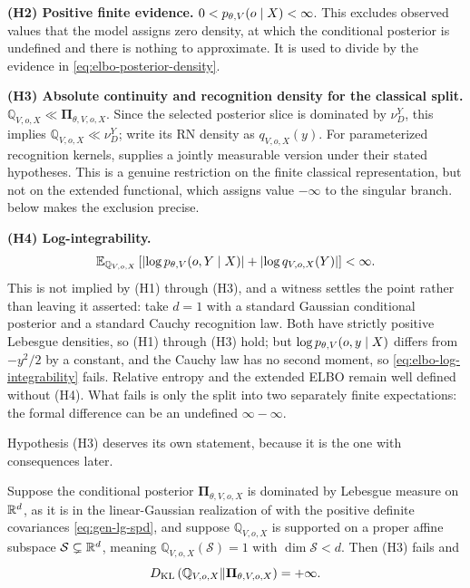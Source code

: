 \textbf{(H2) Positive finite evidence.} \(0<p_{\theta,V}(o\mid X)<\infty\). This excludes observed values that the model assigns zero density, at which the conditional posterior is undefined and there is nothing to approximate. It is used to divide by the evidence in \eqref{eq:elbo-posterior-density}.

\textbf{(H3) Absolute continuity and recognition density for the classical split.} \(\mathbb Q_{V,o,X}\ll\boldsymbol\Pi_{\theta,V,o,X}\). Since the selected posterior slice is dominated by $\nu_D^Y$, this implies \(\mathbb Q_{V,o,X}\ll\nu_D^Y\); write its RN density as \(q_{V,o,X}(y)\). For parameterized recognition kernels,  supplies a jointly measurable version under their stated hypotheses. This is a genuine restriction on the finite classical representation, but not on the extended functional, which assigns value $-\infty$ to the singular branch.  below makes the exclusion precise.

\textbf{(H4) Log-integrability.}
\begin{equation}
\mathbb E_{\mathbb Q_{V,o,X}}\left[
\left|\log p_{\theta,V}(o,Y\mid X)\right|
+\left|\log q_{V,o,X}(Y)\right|
\right]<\infty.
\label{eq:elbo-log-integrability}
\end{equation}
This is not implied by (H1) through (H3), and a witness settles the point rather than leaving it asserted: take \(d=1\) with a standard Gaussian conditional posterior and a standard Cauchy recognition law. Both have strictly positive Lebesgue densities, so (H1) through (H3) hold; but \(\log p_{\theta,V}(o,y\mid X)\) differs from \(-y^{2}/2\) by a constant, and the Cauchy law has no second moment, so \eqref{eq:elbo-log-integrability} fails. Relative entropy and the extended ELBO remain well defined without (H4). What fails is only the split into two separately finite expectations: the formal difference can be an undefined \(\infty-\infty\).

Hypothesis (H3) deserves its own statement, because it is the one with consequences later.

Suppose the conditional posterior \(\boldsymbol\Pi_{\theta,V,o,X}\) is dominated by Lebesgue measure on \(\mathbb R^{d}\), as it is in the linear-Gaussian realization of  with the positive definite covariances \eqref{eq:gen-lg-spd}, and suppose \(\mathbb Q_{V,o,X}\) is supported on a proper affine subspace \(\mathcal S\subsetneq\mathbb R^{d}\), meaning \(\mathbb Q_{V,o,X}(\mathcal S)=1\) with \(\dim\mathcal S<d\). Then (H3) fails and
\begin{equation}
D_{\mathrm{KL}}\left(\mathbb Q_{V,o,X}\middle\Vert\boldsymbol\Pi_{\theta,V,o,X}\right)=+\infty.
\label{eq:elbo-degenerate-infinite}
\end{equation}

